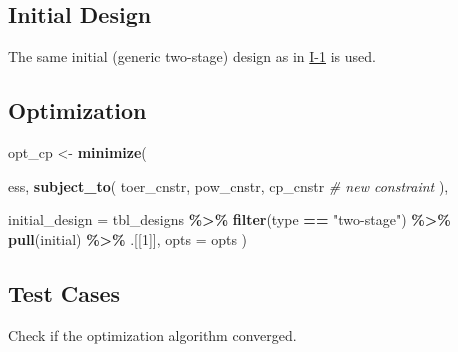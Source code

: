 \documentclass[
]{book}
\newenvironment{Shaded}{\begin{snugshade}}{\end{snugshade}}
\newcommand{\CommentTok}[1]{\textcolor[rgb]{0.56,0.35,0.01}{\textit{#1}}}
\newcommand{\DataTypeTok}[1]{\textcolor[rgb]{0.13,0.29,0.53}{#1}}
\newcommand{\DecValTok}[1]{\textcolor[rgb]{0.00,0.00,0.81}{#1}}
\newcommand{\KeywordTok}[1]{\textcolor[rgb]{0.13,0.29,0.53}{\textbf{#1}}}
\newcommand{\NormalTok}[1]{#1}
\newcommand{\OperatorTok}[1]{\textcolor[rgb]{0.81,0.36,0.00}{\textbf{#1}}}
\newcommand{\StringTok}[1]{\textcolor[rgb]{0.31,0.60,0.02}{#1}}
\begin{document}
\hypertarget{initial-design-1}{%
\subsection{Initial Design}\label{initial-design-1}}

The same initial (generic two-stage) design as in \protect\hyperlink{variantI_1}{I-1} is used.

\hypertarget{optimization-2}{%
\subsection{Optimization}\label{optimization-2}}

\begin{Shaded}
\begin{Highlighting}[]
\NormalTok{opt\_cp \textless{}{-}}\StringTok{ }\KeywordTok{minimize}\NormalTok{(}
      
\NormalTok{    ess,}
    \KeywordTok{subject\_to}\NormalTok{(}
\NormalTok{        toer\_cnstr,}
\NormalTok{        pow\_cnstr,}
\NormalTok{        cp\_cnstr }\CommentTok{\# new constraint}
\NormalTok{    ),}

    \DataTypeTok{initial\_design =}\NormalTok{ tbl\_designs }\OperatorTok{\%\textgreater{}\%}\StringTok{ }
\StringTok{        }\KeywordTok{filter}\NormalTok{(type }\OperatorTok{==}\StringTok{ "two{-}stage"}\NormalTok{) }\OperatorTok{\%\textgreater{}\%}\StringTok{ }
\StringTok{        }\KeywordTok{pull}\NormalTok{(initial) }\OperatorTok{\%\textgreater{}\%}\StringTok{ }
\StringTok{        }\NormalTok{.[[}\DecValTok{1}\NormalTok{]],}
    \DataTypeTok{opts =}\NormalTok{ opts )}
\end{Highlighting}
\end{Shaded}

\hypertarget{test-cases-2}{%
\subsection{Test Cases}\label{test-cases-2}}

Check if the optimization algorithm converged.

\begin{Shaded}
\end{Shaded}
\end{document}
